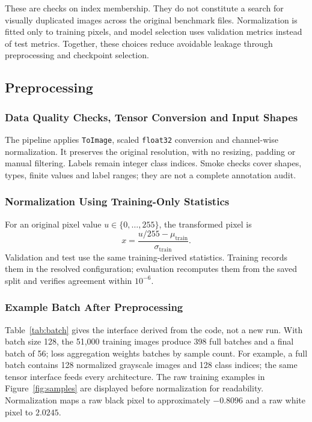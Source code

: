 These are checks on index membership. They do not constitute a search for visually duplicated images across the original benchmark files. Normalization is fitted only to training pixels, and model selection uses validation metrics instead of test metrics. Together, these choices reduce avoidable leakage through preprocessing and checkpoint selection.

\subsection{Preprocessing}
\subsubsection{Data Quality Checks, Tensor Conversion and Input Shapes}
The pipeline applies \texttt{ToImage}, scaled \texttt{float32} conversion and channel-wise normalization. It preserves the original resolution, with no resizing, padding or manual filtering. Labels remain integer class indices. Smoke checks cover shapes, types, finite values and label ranges; they are not a complete annotation audit.

\subsubsection{Normalization Using Training-Only Statistics}
For an original pixel value $u\in\{0,\ldots,255\}$, the transformed pixel is
\begin{equation}
 x=\frac{u/255-\mu_{\mathrm{train}}}{\sigma_{\mathrm{train}}}.
\end{equation}
Validation and test use the same training-derived statistics. Training records them in the resolved configuration; evaluation recomputes them from the saved split and verifies agreement within $10^{-6}$.

\subsubsection{Example Batch After Preprocessing}
Table~\ref{tab:batch} gives the interface derived from the code, not a new run. With batch size 128, the 51,000 training images produce 398 full batches and a final batch of 56; loss aggregation weights batches by sample count. For example, a full batch contains 128 normalized grayscale images and 128 class indices; the same tensor interface feeds every architecture. The raw training examples in Figure~\ref{fig:samples} are displayed before normalization for readability. Normalization maps a raw black pixel to approximately $-0.8096$ and a raw white pixel to $2.0245$.

